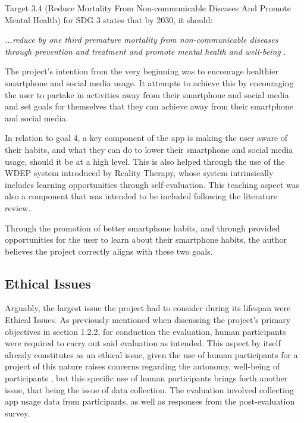 \documentclass[12pt]{article}
\begin{document}
Target 3.4 (Reduce Mortality From Non-communicable Diseases And Promote Mental Health) for SDG 3 states that by 2030, it should:\newline

\textit{...reduce by one third premature mortality from non-communicable diseases through prevention and treatment and promote 
mental health and well-being} \autocite{globalgoals-goal3}.\newline

The project's intention from the very beginning was to encourage healthier smartphone and social media usage. It attempts to achieve this by encouraging the user to partake in activities
away from their smartphone and social media and set goals for themselves that they can achieve away from their smartphone and social media. \newline

In relation to goal 4, a key component of the app is making the user aware of their habits, and what they can do to lower their smartphone and social media usage, should it be at a high level. This is
also helped through the use of the WDEP system introduced by Reality Therapy, whose system intrinsically includes learning opportunities through self-evaluation. This teaching aspect was also a 
component that was intended to be included following the literature review. \newline

Through the promotion of better smartphone habits, and through provided opportunities for the user to learn about their smartphone habits, the author believes the project correctly aligns with
these two goals.

\subsection{Ethical Issues}
Arguably, the largest issue the project had to consider during its lifespan were Ethical Issues. As previously mentioned when discussing
the project's primary objectives in section 1.2.2, for conduction the evaluation, human participants were required to carry out said
evaluation as intended. This aspect by itself already constitutes as an ethical issue, given the use of human participants for a project
of this nature raises concerns regarding the autonomy, well-being of participants  \autocite{RefWorks:RefID:175-punchoojit2015research}, but 
this specific use of human participants brings forth another issue, that being the issue of data collection. The evaluation 
involved collecting app usage data from participants, as well as responses from the post-evaluation survey. \newline
\end{document}
